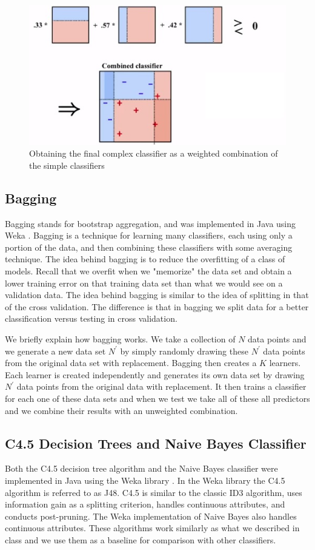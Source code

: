 \documentclass[11pt,oneside,reqno]{amsart}
\theoremstyle{definition}
\theoremstyle{definition}
\theoremstyle{remark}
\numberwithin{equation}{section}
\numberwithin{equation}{section}
\begin{document}
\begin{figure}[H]
  \centering
   {\includegraphics[scale=0.8]{boosting_6}
   \caption{Obtaining the final complex classifier as a weighted combination of the simple classifiers}
  \label{adaboost5}}
\end{figure}
\subsection{Bagging}
Bagging stands for bootstrap aggregation, and was implemented in Java using Weka \cite{Weka}. Bagging is a technique for learning many classifiers, each using only a portion of the data, and then combining these classifiers with some averaging technique. The idea behind bagging is to reduce the overfitting of a class of models. Recall that we overfit when we "memorize" the data set and obtain a lower training error on that training data set than what we would see on a validation data. The idea behind bagging is similar to the idea of splitting in that of the cross validation. The difference is that in bagging we split data for a better classification versus testing in cross validation.


We briefly explain how bagging works. We take a collection of $N$ data points and we generate a new data set $N^{\prime}$ by simply randomly drawing these $N^{\prime}$ data points from the original data set with replacement. Bagging then creates a $K$ learners. Each learner is created independently and generates its own data set by drawing $N^{\prime}$ data points from the original data with replacement. It then trains a classifier for each one of these data sets and when we test we take all of these all predictors and we combine their results with an unweighted combination.

\subsection{C4.5 Decision Trees and Naive Bayes Classifier}
Both the C4.5 decision tree algorithm and the Naive Bayes classifier were implemented in Java using the Weka library \cite{Weka}. In the Weka library the C4.5 algorithm is referred to as J48. C4.5 is similar to the classic ID3 algorithm, uses information gain as a splitting criterion, handles continuous attributes, and conducts post-pruning. The Weka implementation of Naive Bayes also handles continuous attributes. These algorithms work similarly as what we described in class and we use them as a baseline for comparison with other classifiers.
\end{document}
